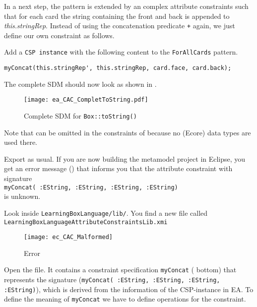 In a next step, the pattern  is extended by an complex attribute constraints such that for each card the string containing the front and back is appended to \emph{this.stringRep}.  	 
Instead of using the concatenation predicate \texttt{+} again, we just define our own constraint as follows.
\begin{stepbystep}
\item 
Add a \texttt{CSP instance} with the following content to the \texttt{ForAllCards} pattern.
\begin{verbatim}
myConcat(this.stringRep', this.stringRep, card.face, card.back);
\end{verbatim}
The complete SDM should now look as shown in .
%
\begin{figure}[htbp]
\begin{center}
  \texttt{[image: ea\_CAC\_CompletToString.pdf]}
  \caption{Complete SDM for \texttt{Box::toString()}}  
  \label{ea_CAC_CompletToString}
\end{center}
\end{figure}
%
Note that  can be omitted in the constraints of  because no (Ecore) data types are used there.
%
\item
Export as usual.
If you are now building the metamodel project in Eclipse, you get an error message () that informs you that the attribute constraint with signature \\
\hspace*{0.5cm} \texttt{\small myConcat( :EString, :EString, :EString, :EString)} \\
is unknown.

\item
Look inside \texttt{LearningBoxLanguage/lib/}.
You find a new file called \texttt{LearningBoxLanguageAttributeConstraintsLib.xmi} 
 
\begin{figure}[htbp]
\begin{center}
  \texttt{[image: ec\_CAC\_Malformed]}
  \caption{Error}  
  \label{ec_CAC_Malformed}
\end{center}
\end{figure}



\item
Open the file.
It contains a constraint specification \texttt{myConcat} ( bottom) that represents the signature (\texttt{\small myConcat( :EString, :EString, :EString, :EString)}), which is derived from the information of the CSP-instance in EA.
To define the meaning of \texttt{myConcat} we have to define operations for the constraint.


\end{stepbystep}

